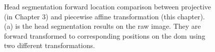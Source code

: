 \begin{figure}[htb!]
  \begin{center}
  \end{center}
  \caption[Head segmentation forward location comparison between projective and piecewise affine transfomration]{
    Head segmentation forward location comparison between projective (in Chapter 3) and piecewise affine transformation (this chapter). (a) is the head segmentation results on the raw image. They are forward transformed to corresponding positions on the \gls{dom} using two different transformations.
  }
  \label{fig:xrs3}
\end{figure}